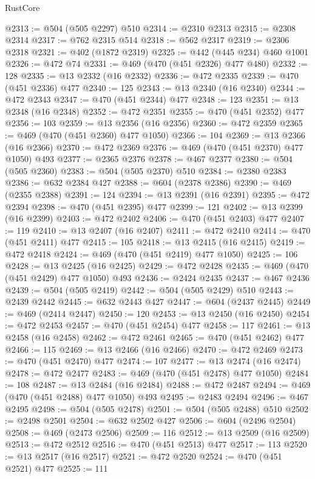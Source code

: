 \begin{lexlean}{RustCore}
\begin{coremodule}
@2313 := @504 (@505 @2297) @510
@2314 := @2310 @2313
@2315 := @2308 @2314
@2317 := @762 @2315 @514
@2318 := @562 @2317
@2319 := @2306 @2318
@2321 := @402 (@1872 @2319)
@2325 := @442 (@445 @234) @460 @1001
@2326 := @472 @74
@2331 := @469 (@470 (@451 @2326) @477 @480)
@2332 := 128
@2335 := @13 @2332 (@16 @2332)
@2336 := @472 @2335
@2339 := @470 (@451 @2336) @477
@2340 := 125
@2343 := @13 @2340 (@16 @2340)
@2344 := @472 @2343
@2347 := @470 (@451 @2344) @477
@2348 := 123
@2351 := @13 @2348 (@16 @2348)
@2352 := @472 @2351
@2355 := @470 (@451 @2352) @477
@2356 := 103
@2359 := @13 @2356 (@16 @2356)
@2360 := @472 @2359
@2365 := @469 (@470 (@451 @2360) @477 @1050)
@2366 := 104
@2369 := @13 @2366 (@16 @2366)
@2370 := @472 @2369
@2376 := @469 (@470 (@451 @2370) @477 @1050) @493
@2377 := @2365 @2376
@2378 := @467 @2377
@2380 := @504 (@505 @2360)
@2383 := @504 (@505 @2370) @510
@2384 := @2380 @2383
@2386 := @632 @2384 @427
@2388 := @604 (@2378 @2386)
@2390 := @469 (@2355 @2388)
@2391 := 124
@2394 := @13 @2391 (@16 @2391)
@2395 := @472 @2394
@2398 := @470 (@451 @2395) @477
@2399 := 121
@2402 := @13 @2399 (@16 @2399)
@2403 := @472 @2402
@2406 := @470 (@451 @2403) @477
@2407 := 119
@2410 := @13 @2407 (@16 @2407)
@2411 := @472 @2410
@2414 := @470 (@451 @2411) @477
@2415 := 105
@2418 := @13 @2415 (@16 @2415)
@2419 := @472 @2418
@2424 := @469 (@470 (@451 @2419) @477 @1050)
@2425 := 106
@2428 := @13 @2425 (@16 @2425)
@2429 := @472 @2428
@2435 := @469 (@470 (@451 @2429) @477 @1050) @493
@2436 := @2424 @2435
@2437 := @467 @2436
@2439 := @504 (@505 @2419)
@2442 := @504 (@505 @2429) @510
@2443 := @2439 @2442
@2445 := @632 @2443 @427
@2447 := @604 (@2437 @2445)
@2449 := @469 (@2414 @2447)
@2450 := 120
@2453 := @13 @2450 (@16 @2450)
@2454 := @472 @2453
@2457 := @470 (@451 @2454) @477
@2458 := 117
@2461 := @13 @2458 (@16 @2458)
@2462 := @472 @2461
@2465 := @470 (@451 @2462) @477
@2466 := 115
@2469 := @13 @2466 (@16 @2466)
@2470 := @472 @2469
@2473 := @470 (@451 @2470) @477
@2474 := 107
@2477 := @13 @2474 (@16 @2474)
@2478 := @472 @2477
@2483 := @469 (@470 (@451 @2478) @477 @1050)
@2484 := 108
@2487 := @13 @2484 (@16 @2484)
@2488 := @472 @2487
@2494 := @469 (@470 (@451 @2488) @477 @1050) @493
@2495 := @2483 @2494
@2496 := @467 @2495
@2498 := @504 (@505 @2478)
@2501 := @504 (@505 @2488) @510
@2502 := @2498 @2501
@2504 := @632 @2502 @427
@2506 := @604 (@2496 @2504)
@2508 := @469 (@2473 @2506)
@2509 := 116
@2512 := @13 @2509 (@16 @2509)
@2513 := @472 @2512
@2516 := @470 (@451 @2513) @477
@2517 := 113
@2520 := @13 @2517 (@16 @2517)
@2521 := @472 @2520
@2524 := @470 (@451 @2521) @477
@2525 := 111

\end{coremodule}
\end{lexlean}
